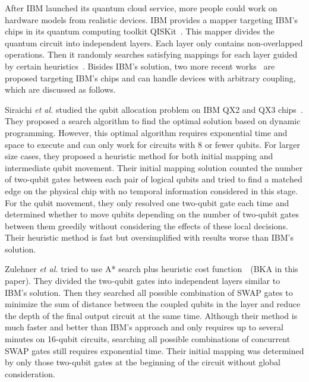 \documentclass[journal,10pt,twocolumn]{IEEEtran}
\begin{document}
After IBM launched its quantum cloud service, more people could work on hardware models from realistic devices.
IBM provides a mapper targeting IBM's chips in its quantum computing toolkit QISKit~\cite{IBMqiskit}. 
This mapper divides the quantum circuit into independent layers. Each layer only contains non-overlapped operations. Then it randomly searches satisfying mappings for each layer guided by certain heuristics~\cite{siraichi2018qubit,zulehner2018efficient}.
Bisides IBM's solution, two more recent works~\cite{siraichi2018qubit,zulehner2018efficient} are proposed targeting IBM's chips and can handle devices with arbitrary coupling, which are discussed as follows.

Siraichi \textit{et al.} studied the qubit allocation problem on IBM QX2 and QX3 chips~\cite{siraichi2018qubit}.
They proposed a search algorithm to find the optimal solution based on dynamic programming.
However, this optimal algorithm requires exponential time and space to execute and can only work for circuits with 8 or fewer qubits.
For larger size cases, they proposed a heuristic method for both initial mapping and intermediate qubit movement.
Their initial mapping solution counted the number of two-qubit gates between each pair of logical qubits and tried to find a matched edge on the physical chip with no temporal information considered in this stage.
For the qubit movement, they only resolved one two-qubit gate each time and determined whether to move qubits depending on the number of two-qubit gates between them greedily without considering the effects of these local decisions. 
Their heuristic method is fast but oversimplified with results worse than IBM's solution.

Zulehner \textit{et al.} tried to use A* search plus heuristic cost function~\cite{zulehner2018efficient}~(BKA in this paper).
They divided the two-qubit gates into independent layers similar to IBM's solution. 
Then they searched all possible combination of SWAP gates to minimize the sum of distance between the coupled qubits in the layer and reduce the depth of the final output circuit at the same time.
Although their method is much faster and better than IBM's approach and only requires up to several minutes on 16-qubit circuits, searching all possible combinations of concurrent SWAP gates still requires exponential time. 
Their initial mapping was determined by only those two-qubit gates at the beginning of the circuit without global consideration.
\end{document}
